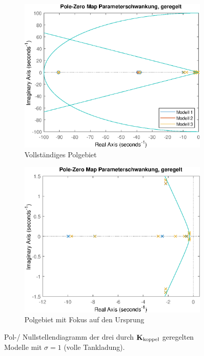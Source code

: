 \begin{figure}[h] %
	\centering
	\begin{subfigure}{.49\textwidth}
		\centering
		\includegraphics[width=\linewidth]{./Bilder/pzmap_controlled_schwankung.eps}
		\caption{Vollständiges Polgebiet}
		\label{fig:pzmap_controlled_schwankung_ohne_zoom}
	\end{subfigure}
	\hfill
	\begin{subfigure}{.49\textwidth}
		\centering
		\includegraphics[width=\linewidth]{./Bilder/pzmap_controlled_schwankung_zoom.eps}
		\caption{Polgebiet mit Fokus auf den Ursprung}
		\label{fig:pzmap_controlled_schwankung_zoom}
	\end{subfigure}
	\caption{Pol-/ Nullstellendiagramm der drei durch ${\boldsymbol{\mathrm{K}}}_{\textnormal{koppel}}$ geregelten Modelle mit $\sigma=1$ (volle Tankladung).}
	\label{fig:pzmap_controlled_schwankung}
\end{figure}


